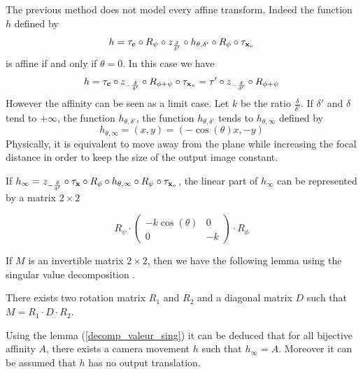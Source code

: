 \begin{remarque}
The previous method does not model every affine transform. Indeed the function $h$ defined by 
\begin{equation*}
h = \tau_{\mathbf{c}}   \circ R_{\psi} \circ z_{\frac{\delta}{\delta'}} \circ h_{\theta,\delta'} \circ R_{\phi} \circ \tau_{\mathbf{x}_v}
\end{equation*}
is affine if and only if $\theta=0$. In this case we have
\begin{equation*}
h= \tau_{\mathbf{c}} \circ z_{-\frac{\delta}{\delta'}} \circ R_{\phi+\psi} \circ \tau_{\mathbf{x}_{v}}
=\tau' \circ z_{-\frac{\delta}{\delta'}} \circ  R_{\phi+\psi}
\end{equation*}
However the affinity can be seen as a limit case. Let $k$ be the ratio $\frac{\delta}{\delta'}$. If $\delta'$ and $\delta$ tend to $+\infty$, the function $h_{\theta,\delta'}$, the function $h_{\theta,\delta'}$ tends to $h_{\theta,\infty}$ defined by
\begin{equation*}
h_{\theta,\infty}=(x,y)=(-\cos(\theta)x,-y)
\end{equation*}
Physically, it is equivalent to move away from the plane while increasing the focal distance in order to keep the size of the output image constant.

If $h_\infty = z_{-\frac{\delta}{\delta'}} \circ \tau_{\mathbf{x}} \circ R_{\phi} \circ h_{\theta,\infty} \circ R_{\psi} \circ \tau_{\mathbf{x}_{v}}$, the linear part of $h_{\infty}$ can be represented by a matrix $2\times2$

\begin{equation*}
R_{\psi} \cdot 
\begin{pmatrix}
-k\cos(\theta)&0\\
0&-k
\end{pmatrix}
\cdot R_{\phi}
\end{equation*}

If $M$ is an invertible matrix $2\times 2$, then we have the following lemma using the singular value decomposition \cite{morel2009asift}.
\begin{lem}
There exists two rotation matrix $R_1$ and $R_2$ and a diagonal matrix $D$ such that $M = R_1 \cdot D \cdot R_2$.
\label{decomp_valeur_sing}
\end{lem}

Using the lemma (\ref{decomp_valeur_sing}) it can be deduced that for all bijective affinity $A$, there exists a camera movement $h$ such that $h_\infty = A$. Moreover it can be assumed that $h$ has no output translation.
\end{remarque}







